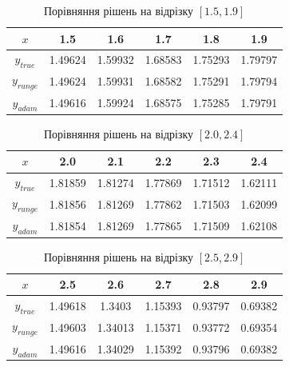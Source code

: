 \documentclass{article}
\begin{document}
        \begin{table}[h!]
            \centering
            \begin{tabular}{|c|c|c|c|c|c|}
                \hline
                $x$ & 1.5 & 1.6 & 1.7 & 1.8 & 1.9 \\
                \hline
                $y_{true}$ & 1.49624 & 1.59932 & 1.68583 & 1.75293 & 1.79797 \\
                \hline
                $y_{runge}$ & 1.49624 & 1.59931 & 1.68582 & 1.75291 & 1.79794 \\
                \hline
                $y_{adam}$ & 1.49616 & 1.59924 & 1.68575 & 1.75285 & 1.79791 \\
                \hline
            \end{tabular}
            \caption{Порівняння рішень на відрізку $[1.5, 1.9]$}
        \end{table}

        \begin{table}[h!]
            \centering
            \begin{tabular}{|c|c|c|c|c|c|}
                \hline
                $x$ & 2.0 & 2.1 & 2.2 & 2.3 & 2.4 \\
                \hline
                $y_{true}$ & 1.81859 & 1.81274 & 1.77869 & 1.71512 & 1.62111 \\
                \hline
                $y_{runge}$ & 1.81856 & 1.81269 & 1.77862 & 1.71503 & 1.62099 \\
                \hline
                $y_{adam}$ & 1.81854 & 1.81269 & 1.77865 & 1.71509 & 1.62108 \\
                \hline
            \end{tabular}
            \caption{Порівняння рішень на відрізку $[2.0, 2.4]$}
        \end{table}

        \begin{table}[h!]
            \centering
            \begin{tabular}{|c|c|c|c|c|c|}
                \hline
                $x$ & 2.5 & 2.6 & 2.7 & 2.8 & 2.9 \\
                \hline
                $y_{true}$ & 1.49618 & 1.3403 & 1.15393 & 0.93797 & 0.69382 \\
                \hline
                $y_{runge}$ & 1.49603 & 1.34013 & 1.15371 & 0.93772 & 0.69354 \\
                \hline
                $y_{adam}$ & 1.49616 & 1.34029 & 1.15392 & 0.93796 & 0.69382 \\
                \hline
            \end{tabular}
            \caption{Порівняння рішень на відрізку $[2.5, 2.9]$}
        \end{table}
\end{document}
